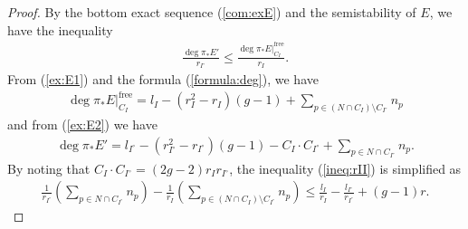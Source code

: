\documentclass[11pt,oneside,a4paper,mathscr]{amsart}
\theoremstyle{definition}
\renewcommand{\leq}{\leqslant}
\begin{document}
\begin{proof}
By the bottom exact sequence (\ref{com:exE})
and the semistability of $E$, we have the inequality 
\begin{align}\label{ineq:rII}
    \frac{\deg \pi_{*}E'}{r_{I^{\circ}}} \leq \frac{\deg \pi_{*}E|_{C_I}^{\mathrm{free}}}{r_I}.
\end{align}
From (\ref{ex:E1}) and the formula (\ref{formula:deg}), we have 
\begin{align*}
\deg \pi_{*}E|_{C_I}^{\mathrm{free}}=l_I-(r_I^2-r_I)(g-1)+\sum_{p\in (N\cap C_I)\setminus C_{I^{\circ}}}n_p
\end{align*}
and from (\ref{ex:E2}) we have 
\begin{align*}
    \deg \pi_{*}E'=l_{I^{\circ}}-(r_{I^{\circ}}^2-r_{I^{\circ}})(g-1)-C_I \cdot C_{I^{\circ}}+\sum_{p\in N \cap C_{I^{\circ}}}n_p.
\end{align*}
By noting that 
$C_I \cdot C_{I^{\circ}}=(2g-2)r_I r_{I^{\circ}}$, 
the inequality (\ref{ineq:rII}) is simplified as 
\begin{align}\label{ineq:lI}
    \frac{1}{r_{I^{\circ}}}\left(\sum_{p\in N \cap C_{I^{\circ}}}n_p  \right)
    -\frac{1}{r_I}\left(\sum_{p\in (N\cap C_I)\setminus C_{I^{\circ}}}n_p  \right) 
    \leq \frac{l_I}{r_I}-\frac{l_{I^{\circ}}}{r_{I^{\circ}}}+(g-1)r.
\end{align}


\end{proof}
\end{document}

